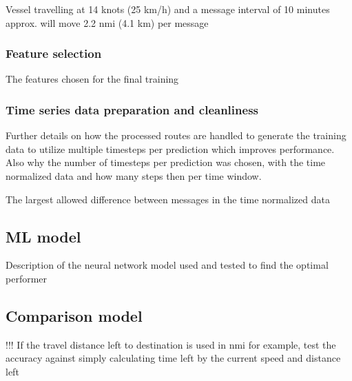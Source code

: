 \documentclass[../main.tex]{subfiles}
\begin{document}
Vessel travelling at 14 knots (25 km/h) and a message interval of 10 minutes approx. will move 2.2 nmi (4.1 km) per message


\subsubsection{Feature selection}

The features chosen for the final training 


\subsubsection{Time series data preparation and cleanliness}

Further details on how the processed routes are handled to generate the training data to utilize multiple timesteps per prediction which improves performance. Also why the number of timesteps per prediction was chosen, with the time normalized data and how many steps then per time window. 

The largest allowed difference between messages in the time normalized data

\subsection{ML model}

Description of the neural network model used and tested to find the optimal performer


\subsection{Comparison model}

!!! If the travel distance left to destination is used in nmi for example, test the accuracy against simply calculating time left by the current speed and distance left 
\end{document}
